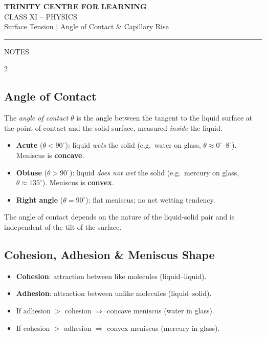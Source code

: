 \documentclass[12pt, a4paper]{exam}
\newcommand{\boxsection}[1]{%
    \par\vspace{0.6em}\noindent
    \begin{sectionbox}
        #1
    \end{sectionbox}
    \vspace{0.5em}
}
\begin{document}
\begin{center}
    {\sffamily\bfseries\Large TRINITY CENTRE FOR LEARNING}\\[2pt]
    {\sffamily\large CLASS XI -- PHYSICS}\\[2pt]
    {\sffamily\normalsize Surface Tension $|$ Angle of Contact \& Capillary Rise}
\end{center}
\vspace{0.3em}
\noindent\rule{\linewidth}{0.8pt}
\vspace{0.3em}

\boxsection{NOTES}

\begin{multicols}{2}

\subsection*{Angle of Contact}

The \textit{angle of contact} $\theta$ is the angle between the tangent to the liquid surface at the point of contact and the solid surface, measured \emph{inside} the liquid.

\begin{itemize}[leftmargin=*, itemsep=2pt]
    \item \textbf{Acute} ($\theta < 90^\circ$): liquid \textit{wets} the solid (e.g.\ water on glass, $\theta \approx 0^\circ$--$8^\circ$). Meniscus is \textbf{concave}.
    \item \textbf{Obtuse} ($\theta > 90^\circ$): liquid \textit{does not wet} the solid (e.g.\ mercury on glass, $\theta \approx 135^\circ$). Meniscus is \textbf{convex}.
    \item \textbf{Right angle} ($\theta = 90^\circ$): flat meniscus; no net wetting tendency.
\end{itemize}

The angle of contact depends on the nature of the liquid-solid pair and is independent of the tilt of the surface.

\subsection*{Cohesion, Adhesion \& Meniscus Shape}

\begin{itemize}[leftmargin=*, itemsep=2pt]
    \item \textbf{Cohesion}: attraction between like molecules (liquid--liquid).
    \item \textbf{Adhesion}: attraction between unlike molecules (liquid--solid).
    \item If adhesion $>$ cohesion $\Rightarrow$ concave meniscus (water in glass).
    \item If cohesion $>$ adhesion $\Rightarrow$ convex meniscus (mercury in glass).
\end{itemize}


\end{multicols}
\end{document}
